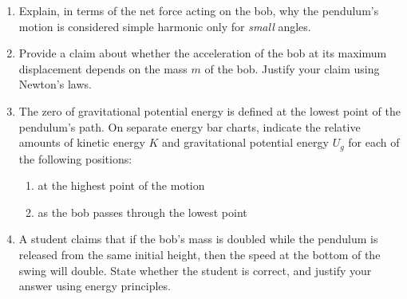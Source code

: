 \documentclass[12pt]{article}
\begin{document}
\begin{enumerate}[label=\textbf{(\alph*)}]
\item Explain, in terms of the net force acting on the bob, why the pendulum's motion is considered simple harmonic only for \textit{small} angles.

\item Provide a claim about whether the acceleration of the bob at its maximum displacement depends on the mass $m$ of the bob. Justify your claim using Newton's laws.

\item The zero of gravitational potential energy is defined at the lowest point of the pendulum's path. On separate energy bar charts, indicate the relative amounts of kinetic energy $K$ and gravitational potential energy $U_g$ for each of the following positions:
\begin{enumerate}[label=\textbf{\roman*.}]
\item at the highest point of the motion
\item as the bob passes through the lowest point
\end{enumerate}

\item A student claims that if the bob's mass is doubled while the pendulum is released from the same initial height, then the speed at the bottom of the swing will double. State whether the student is correct, and justify your answer using energy principles.
\end{enumerate}
\end{document}
